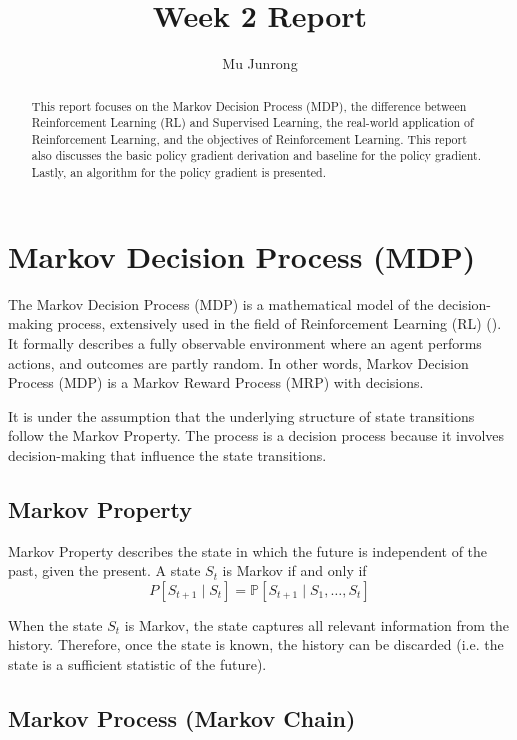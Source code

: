 \documentclass{article} %
\title{Week 2 Report}
\author{Mu Junrong}
\begin{document}
\ifcolmsubmission
\linenumbers
\fi

\maketitle

\begin{abstract}
This report focuses on the Markov Decision Process (MDP), the difference between Reinforcement Learning (RL) and Supervised Learning, the real-world application of Reinforcement Learning, and the objectives of Reinforcement Learning. This report also discusses the basic policy gradient derivation and baseline for the policy gradient. Lastly, an algorithm for the policy gradient is presented.
\end{abstract}

\section{Markov Decision Process (MDP)}

The Markov Decision Process (MDP) is a mathematical model of the decision-making process, extensively used in the field of Reinforcement Learning (RL) (\cite{sutton2018reinforcement}). It formally describes a fully observable environment where an agent performs actions, and outcomes are partly random. In other words, Markov Decision Process (MDP) is a Markov Reward Process (MRP) with decisions. 

It is under the assumption that the underlying structure of state transitions follow the Markov Property. The process is a decision process because it involves decision-making that influence the state transitions.


\subsection{Markov Property}

Markov Property describes the state in which the future is independent of the past, given the present. A state $S_t$ is Markov if and only if
\[{P}[S_{t+1} \mid S_t] = \mathbb{P}[S_{t+1} \mid S_1, \ldots, S_t]\]

When the state $S_t$ is Markov, the state captures all relevant information from the history. Therefore, once the state is known, the history can be discarded (i.e. the state is a sufficient statistic of the future).


\subsection{Markov Process (Markov Chain)}
\end{document}
